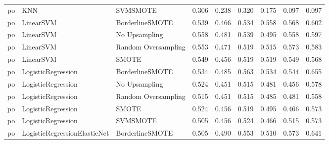 \begin{tabular}{lllllllll}
      po &                          KNN &            SVMSMOTE &     0.306 &                     0.238 &                 0.320 &                  0.175 &                                   0.097 &     0.097 \\
      po &                    LinearSVM &     BorderlineSMOTE &     0.539 &                     0.466 &                 0.534 &                  0.558 &                                   0.568 &     0.602 \\
      po &                    LinearSVM &       No Upsampling &     0.558 &                     0.481 &                 0.539 &                  0.495 &                                   0.558 &     0.597 \\
      po &                    LinearSVM & Random Oversampling &     0.553 &                     0.471 &                 0.519 &                  0.515 &                                   0.573 &     0.583 \\
      po &                    LinearSVM &               SMOTE &     0.549 &                     0.456 &                 0.519 &                  0.519 &                                   0.549 &     0.568 \\
      po &           LogisticRegression &     BorderlineSMOTE &     0.534 &                     0.485 &                 0.563 &                  0.534 &                                   0.544 &     0.655 \\
      po &           LogisticRegression &       No Upsampling &     0.524 &                     0.451 &                 0.515 &                  0.481 &                                   0.456 &     0.578 \\
      po &           LogisticRegression & Random Oversampling &     0.515 &                     0.451 &                 0.515 &                  0.485 &                                   0.481 &     0.558 \\
      po &           LogisticRegression &               SMOTE &     0.524 &                     0.456 &                 0.519 &                  0.495 &                                   0.466 &     0.573 \\
      po &           LogisticRegression &            SVMSMOTE &     0.505 &                     0.456 &                 0.524 &                  0.466 &                                   0.515 &     0.573 \\
      po & LogisticRegressionElasticNet &     BorderlineSMOTE &     0.505 &                     0.490 &                 0.553 &                  0.510 &                                   0.573 &     0.641 \\

\end{tabular}
